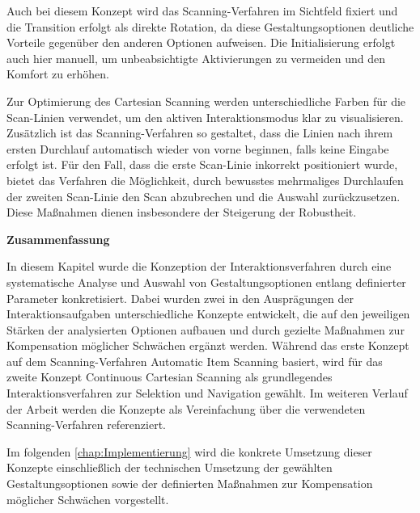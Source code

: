 Auch bei diesem Konzept wird das Scanning-Verfahren im Sichtfeld fixiert und die Transition erfolgt als direkte Rotation, da diese Gestaltungsoptionen deutliche Vorteile gegenüber den anderen Optionen aufweisen. Die Initialisierung erfolgt auch hier manuell, um unbeabsichtigte Aktivierungen zu vermeiden und den Komfort zu erhöhen.

Zur Optimierung des Cartesian Scanning werden unterschiedliche Farben für die Scan-Linien verwendet, um den aktiven Interaktionsmodus klar zu visualisieren. Zusätzlich ist das Scanning-Verfahren so gestaltet, dass die Linien nach ihrem ersten Durchlauf automatisch wieder von vorne beginnen, falls keine Eingabe erfolgt ist. Für den Fall, dass die erste Scan-Linie inkorrekt positioniert wurde, bietet das Verfahren die Möglichkeit, durch bewusstes mehrmaliges Durchlaufen der zweiten Scan-Linie den Scan abzubrechen und die Auswahl zurückzusetzen. Diese Maßnahmen dienen insbesondere der Steigerung der Robustheit.

{\normalfont \bfseries Zusammenfassung}

In diesem Kapitel wurde die Konzeption der Interaktionsverfahren durch eine systematische Analyse und Auswahl von Gestaltungsoptionen entlang definierter Parameter konkretisiert. Dabei wurden zwei in den Ausprägungen der Interaktionsaufgaben unterschiedliche Konzepte entwickelt, die auf den jeweiligen Stärken der analysierten Optionen aufbauen und durch gezielte Maßnahmen zur Kompensation möglicher Schwächen ergänzt werden. Während das erste Konzept auf dem Scanning-Verfahren Automatic Item Scanning basiert, wird für das zweite Konzept Continuous Cartesian Scanning als grundlegendes Interaktionsverfahren zur Selektion und Navigation gewählt. Im weiteren Verlauf der Arbeit werden die Konzepte als Vereinfachung über die verwendeten Scanning-Verfahren referenziert. 

Im folgenden \autoref{chap:Implementierung} wird die konkrete Umsetzung dieser Konzepte einschließlich der technischen Umsetzung der gewählten Gestaltungsoptionen sowie der definierten Maßnahmen zur Kompensation möglicher Schwächen vorgestellt.